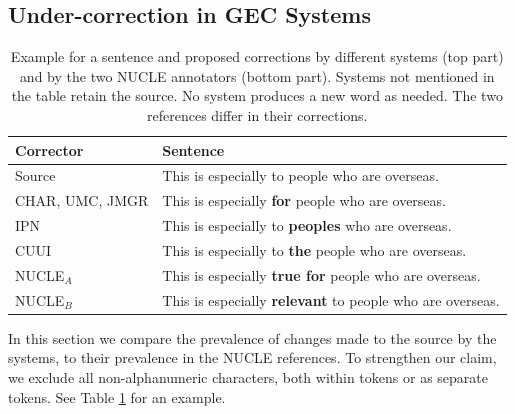 \documentclass[11pt, a4paper]{article}
\begin{document}
\subsection{Under-correction in GEC Systems}\label{subsec:under-correction}
\begin{table}
	\centering
	\small
	\singlespacing
	\begin{tabular}{l|p{4cm}}
		Corrector & Sentence \\
		\hline
		Source & This is especially to people who are overseas. \\
		\hline 
		CHAR, UMC, JMGR & This is especially \textbf{for} people who are overseas. \\ 
		IPN & This is especially to \textbf{peoples} who are overseas. \\ 
		CUUI &  This is especially to \textbf{the} people who are overseas. \\ 
		\hline
		NUCLE$_A$ & This is especially \textbf{true for} people who are overseas.\\
		NUCLE$_B$ & This is especially \textbf{relevant} to people who are overseas.
	\end{tabular}
	\caption{\label{tab:nucle_example} Example for a sentence and proposed corrections by different systems (top part) and by the two NUCLE annotators (bottom part). Systems not mentioned in the table retain the source. No system produces a new word as needed. The two references differ in their corrections.} 
\end{table} 

In this section we compare the prevalence of changes made to the source by the systems,
to their prevalence in the NUCLE references. 
To strengthen our claim, we exclude all non-alphanumeric characters, 
both within tokens or as separate tokens. See Table \ref{tab:nucle_example} 
for an example.
\end{document}
